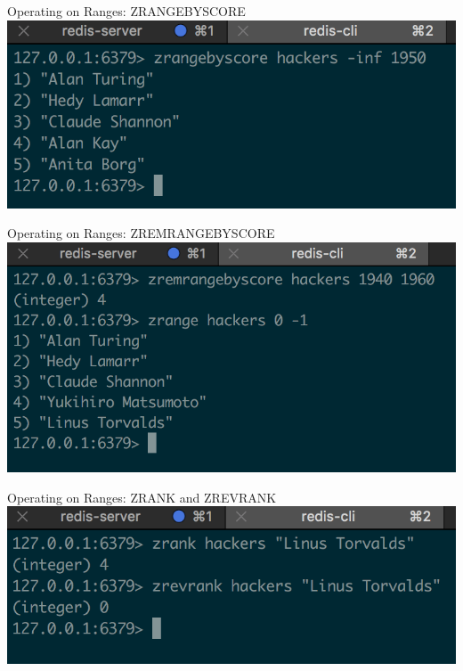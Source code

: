 \documentclass[10pt]{beamer}
\begin{document}
\begin{frame}[fragile]{Operating on Ranges: ZRANGEBYSCORE}
  \includegraphics[scale=0.8]{img/zrangebyscore}
\end{frame}

\begin{frame}[fragile]{Operating on Ranges: ZREMRANGEBYSCORE}
  \includegraphics[scale=0.8]{img/zremrangebyscore}
\end{frame}

\begin{frame}[fragile]{Operating on Ranges: ZRANK and ZREVRANK}
  \includegraphics[scale=0.8]{img/zrank-zrevrank}
\end{frame}
\end{document}
